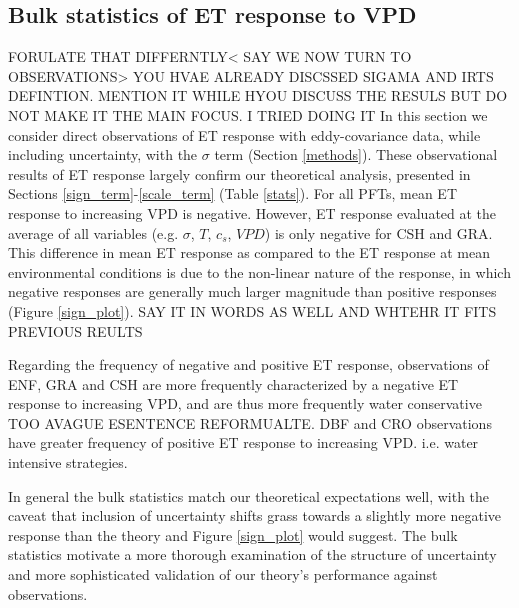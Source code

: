 \documentclass[draft,linenumbers]{agujournal}
\begin{document}
\subsection{Bulk statistics of ET response to VPD}
\label{stats_sec}
FORULATE THAT DIFFERNTLY< SAY WE NOW TURN TO OBSERVATIONS> YOU HVAE ALREADY DISCSSED SIGAMA AND IRTS DEFINTION. MENTION IT WHILE HYOU DISCUSS THE RESULS BUT DO NOT MAKE IT THE MAIN FOCUS. I TRIED DOING IT
In this section we consider direct observations of ET response with eddy-covariance data, while including uncertainty, with the $\sigma$ term (Section \ref{methods}). These observational results of ET response largely confirm our theoretical analysis, presented in Sections \ref{sign_term}-\ref{scale_term} (Table \ref{stats}). For all PFTs, mean ET response to increasing VPD is negative. However, ET response evaluated at the average of all variables (e.g. $\sigma$, $T$, $c_s$, $VPD$) is only negative for CSH and GRA. This difference in mean ET response as compared to the ET response at mean environmental conditions is due to the non-linear nature of the response, in which negative responses are generally much larger magnitude than positive responses (Figure \ref{sign_plot}). SAY IT IN WORDS AS WELL AND WHTEHR IT FITS PREVIOUS REULTS

Regarding the frequency of negative and positive ET response, observations of ENF, GRA and CSH are more frequently characterized by a negative ET response to increasing VPD, and are thus more frequently water conservative TOO AVAGUE ESENTENCE REFORMUALTE. DBF and CRO observations have greater frequency of positive ET response to increasing VPD. i.e. water intensive strategies. 

In general the bulk statistics match our theoretical expectations well, with the caveat that inclusion of uncertainty shifts grass towards a slightly more negative response than the theory and Figure \ref{sign_plot} would suggest. The bulk statistics motivate a more thorough examination of the structure of uncertainty and more sophisticated validation of our theory's performance against observations. 
\end{document}
